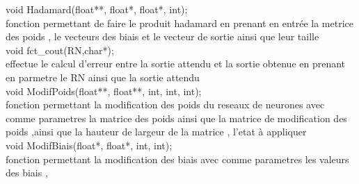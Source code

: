\documentclass{article}
\begin{document}
			void Hadamard(float**, float*, float*, int);\\
				fonction permettant de faire le produit hadamard en prenant en entrée la metrice des poids , le vecteurs des biais et le vecteur de sortie ainsi que leur taille\\
			void fct_cout(RN,char*);\\
				effectue le calcul d'erreur entre la sortie attendu et la sortie obtenue en prenant en parmetre le RN ainsi que la sortie attendu \\
				
			void ModifPoids(float**, float**, int, int, int);\\
				fonction permettant la modification des poids du reseaux de neurones avec comme parametres la matrice des poids ainsi que la matrice de modification des poids ,ainsi que la hauteur de largeur de la matrice , l'etat à appliquer \\
				
			void ModifBiais(float*, float*, int, int);\\
				fonction permettant la modification des biais avec comme parametres les valeurs des biais ,
\end{document}
